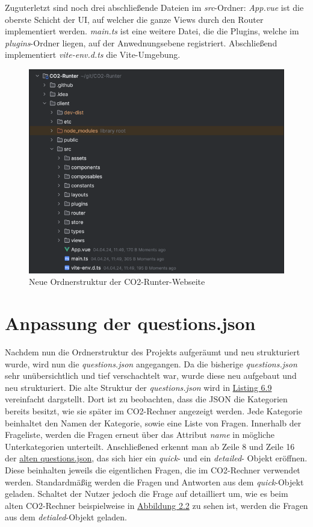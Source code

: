 Zuguterletzt sind noch drei abschließende Dateien im \textit{src}-Ordner: \textit{App.vue} ist die oberste Schicht der UI, auf welcher die ganze Views durch den Router implementiert werden.
\textit{main.ts} ist eine weitere Datei, die die Plugins, welche im \textit{plugins}-Ordner liegen, auf der Anwednungsebene registriert.
Abschließend implementiert \textit{vite-env.d.ts} die Vite-Umgebung.\newpage
\begin{figure}[h]
    \centering
    \includegraphics[width=1\textwidth]{images/06/ordnerstruktur_projekt.png}
    \caption{Neue Ordnerstruktur der CO2-Runter-Webseite}
    \label{fig:ordnerstruktur_neu}
\end{figure}

\section{Anpassung der questions.json}
\label{sec:anpassung-der-questions-json}
Nachdem nun die Ordnerstruktur des Projekts aufgeräumt und neu strukturiert wurde, wird nun die \textit{questions.json} angegangen.
Da die bisherige \textit{questions.json} sehr unübersichtlich und tief verschachtelt war, wurde diese neu aufgebaut und neu strukturiert.
Die alte Struktur der \textit{questions.json} wird in \hyperref[lst:questions-json-old]{Listing 6.9} vereinfacht dargstellt.
Dort ist zu beobachten, dass die \acs{JSON} die Kategorien bereits besitzt, wie sie später im CO2-Rechner angezeigt werden.
Jede Kategorie beinhaltet den Namen der Kategorie, sowie eine Liste von Fragen.
Innerhalb der Frageliste, werden die Fragen erneut über das Attribut \textit{name} in mögliche Unterkategorien unterteilt.
Anschließened erkennt man ab Zeile 8 und Zeile 16 der \hyperref[lst:questions-json-old]{alten questions.json}, das sich hier ein \textit{quick}- und ein \textit{detailed}- Objekt eröffnen.
Diese beinhalten jeweils die eigentlichen Fragen, die im CO2-Rechner verwendet werden.
Standardmäßig werden die Fragen und Antworten aus dem \textit{quick}-Objekt geladen.
Schaltet der Nutzer jedoch die Frage auf detailliert um, wie es beim alten CO2-Rechner beispielweise in \hyperref[fig:co2runterapp-rechner]{Abbildung 2.2} zu sehen ist, werden die Fragen aus dem \textit{detialed}-Objekt geladen. \newpage

